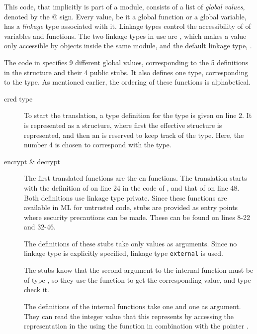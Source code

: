 This code, that implicitly is part of a module, consists of a list of \emph{global values}, denoted by the @ sign.
Every value, be it a global function or a global variable, has a \emph{linkage} type associated with it.
Linkage types control the accessibility of of variables and functions. The two linkage types in use are , which makes a value only accessible by objects inside the same module, and the default linkage type, .

The code in  specifies 9 different global values, corresponding to the 5 definitions in the  structure and their 4 public stubs. It also defines one type, corresponding to the  type.
As mentioned earlier, the ordering of these functions is alphabetical.
\begin{description}
\item[cred type] To start the translation, a type definition for the  type is given on line 2.
It is represented as a structure, where first the effective structure is represented, and then an  is reserved to keep track of the type.
Here, the number 4 is chosen to correspond with the  type.

\item[encrypt \& decrypt] The first translated functions are the  en  functions. The translation starts with the definition of  on line 24 in the code of , and that of  on line 48.
Both definitions use linkage type private.
Since these functions are available in ML for untrusted code, stubs are provided as entry points where security precautions can be made. These can be found on lines 8-22 and 32-46.

The definitions of these stubs take only  values as arguments.
Since no linkage type is explicitly specified, linkage type \lstinline[language={[x86masm]Assembler}]{external}  is used.

The stubs know that the second argument to the internal function must be of type , so they use the  function to get the corresponding  value, and type check it.

The definitions of the internal functions take one  and one  as argument.
They can read the integer value that this  represents by accessing the representation in the using the  function in combination with the pointer .


\end{description}
